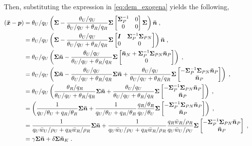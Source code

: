 \documentclass{article}
\begin{document}
Then, substituting the expression in \eqref{eq:dem_exogena} yields the following,
\begin{equation}
	\begin{split}
		(\bm{\Bar{x}}-\bm{p})&=\theta_{U}/q_{U}\left(\bm{\Sigma} - \frac{\theta_U/q_U}{\theta_U/q_U + \theta_R/q_R}\bm{\Sigma}\begin{bmatrix}
			\bm{\Sigma}^{-1}_{P} & 0\\
			0 & 0
		\end{bmatrix}
		\bm{\Sigma}
		\right)\bm{\Bar{n}}\;,\\
		&=\theta_{U}/q_{U}\left(\bm{\Sigma} - \frac{\theta_U/q_U}{\theta_U/q_U + \theta_R/q_R}\bm{\Sigma}\begin{bmatrix}
			\bm{I} & \bm{\Sigma}^{-1}_{P}\bm{\Sigma}_{PN}\\
			0 & 0
		\end{bmatrix}
		\right)\bm{\Bar{n}}\;,\\
		&= \theta_{U}/q_{U}\left(\bm{\Sigma}\bm{\Bar{n}} - \frac{\theta_U/q_U}{\theta_U/q_U + \theta_R/q_R}\bm{\Sigma}\begin{bmatrix}
			\bm{\Bar{n}}_{N}+\bm{\Sigma}^{-1}_{P}\bm{\Sigma}_{PN}\bm{\Bar{n}}_{P}\\
			0 
		\end{bmatrix}
		\right)\;,\\
		&= \theta_{U}/q_{U}\left(\bm{\Sigma}\bm{\Bar{n}} -\frac{\theta_U/q_U}{\theta_U/q_U + \theta_R/q_R}\bm{\Sigma}\bm{\Bar{n}}+ \frac{\theta_U/q_U}{\theta_U/q_U + \theta_R/q_R}\bm{\Sigma}\begin{bmatrix}
			-\bm{\Sigma}^{-1}_{P}\bm{\Sigma}_{PN}\bm{\Bar{n}}_{P}\\
			\bm{\Bar{n}}_{P} 
		\end{bmatrix}
		\right)\;,\\
		&= \theta_{U}/q_{U}\left(\frac{\theta_R/q_R}{\theta_U/q_U + \theta_R/q_R}\bm{\Sigma}\bm{\Bar{n}}+ \frac{\theta_U/q_U}{\theta_U/q_U + \theta_R/q_R}\bm{\Sigma}\begin{bmatrix}
			-\bm{\Sigma}^{-1}_{P}\bm{\Sigma}_{PN}\bm{\Bar{n}}_{P}\\
			\bm{\Bar{n}}_{P} 
		\end{bmatrix}
		\right)\;,\\
		&= \left(\frac{1}{q_U/\theta_U + q_R/\theta_R}\bm{\Sigma}\bm{\Bar{n}}+ \frac{1}{q_U/\theta_U + q_R/\theta_R}\frac{q_{R}/\theta_R}{q_U/\theta_U}\bm{\Sigma}\begin{bmatrix}
			-\bm{\Sigma}^{-1}_{P}\bm{\Sigma}_{PN}\bm{\Bar{n}}_{P}\\
			\bm{\Bar{n}}_{P} 
		\end{bmatrix}
		\right)\;,\\
		&= \frac{1}{q_U\Bar{w}_U/\rho_U + q_R\Bar{w}_R/\rho_R}\bm{\Sigma}\bm{\Bar{n}}+ \frac{1}{q_U\Bar{w}_U/\rho_U + q_R\Bar{w}_R/\rho_R}\frac{q_{R}\Bar{w}_R/\rho_R}{q_U\Bar{w}_U/\rho_U}\bm{\Sigma}\begin{bmatrix}
			-\bm{\Sigma}^{-1}_{P}\bm{\Sigma}_{PN}\bm{\Bar{n}}_{P}\\
			\bm{\Bar{n}}_{P} 
		\end{bmatrix}
		\;,\\
		&=\gamma\bm{\Sigma}\bm{\Bar{n}} + \delta\bm{\Sigma}\bm{\Bar{n}}_K\;.
	\end{split}
	\label{eq:id-boicott}
\end{equation}
\end{document}
